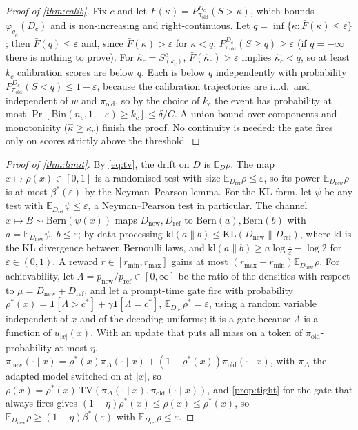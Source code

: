 \documentclass{article}
\theoremstyle{plain}
\theoremstyle{definition}
\theoremstyle{remark}
\newcommand{\E}{\mathbb{E}}
\newcommand{\TV}{\mathrm{TV}}
\newcommand{\KL}{\mathrm{KL}}
\newcommand{\kl}{\mathrm{kl}}
\newcommand{\Dref}{D_{\mathrm{ref}}}
\newcommand{\Dnew}{D_{\mathrm{new}}}
\newcommand{\pold}{\pi_{\mathrm{old}}}
\newcommand{\pnew}{\pi_{\mathrm{new}}}
\newcommand{\ind}{\mathbf{1}}
\begin{document}
\begin{proof}[Proof of \cref{thm:calib}]
Fix $c$ and let $\bar F(\kappa)=P^{D_c}_{\pold}(S>\kappa)$, which bounds $\varphi_{g_\kappa}(D_c)$ and is
non-increasing and right-continuous. Let
$q=\inf\{\kappa:\bar F(\kappa)\le\varepsilon\}$; then $\bar F(q)\le\varepsilon$ and, since $\bar F(\kappa)>\varepsilon$
for $\kappa<q$, $P^{D_c}_{\pold}(S\ge q)\ge\varepsilon$ (if $q=-\infty$ there is nothing to prove). For
$\hat\kappa_c=S^c_{(k_c)}$, $\bar F(\hat\kappa_c)>\varepsilon$ implies $\hat\kappa_c<q$, so at least $k_c$ calibration scores
are below $q$. Each is below $q$ independently with probability $P^{D_c}_{\pold}(S<q)\le1-\varepsilon$, because the
calibration trajectories are i.i.d.\ and independent of $w$ and $\pold$, so by the choice of $k_c$ the event has probability at
most $\Pr[\mathrm{Bin}(n_c,1-\varepsilon)\ge k_c]\le\delta/C$. A union bound over components and monotonicity
($\hat\kappa\ge\hat\kappa_c$) finish the proof. No continuity is needed: the gate fires only on scores strictly
above the threshold.
\end{proof}

\begin{proof}[Proof of \cref{thm:limit}]
By \cref{eq:tv}, the drift on $D$ is $\E_D\rho$. The map $x\mapsto\rho(x)\in[0,1]$ is a randomised test with size
$\E_{\Dref}\rho\le\varepsilon$, so its power $\E_{\Dnew}\rho$ is at most $\beta^\ast(\varepsilon)$ by the
Neyman--Pearson lemma. For the KL form, let $\psi$ be any test with $\E_{\Dref}\psi\le\varepsilon$, a Neyman--Pearson test in
particular. The channel $x\mapsto B\sim\mathrm{Bern}(\psi(x))$ maps $\Dnew,\Dref$ to $\mathrm{Bern}(a),\mathrm{Bern}(b)$
with $a=\E_{\Dnew}\psi$, $b\le\varepsilon$; by data processing $\kl(a\|b)\le\KL(\Dnew\|\Dref)$, where $\kl$ is the
KL divergence between Bernoulli laws, and $\kl(a\|b)\ge a\log\frac1\varepsilon-\log 2$ for $\varepsilon\in(0,1)$. A
reward $r\in[r_{\min},r_{\max}]$ gains at most $(r_{\max}-r_{\min})\E_{\Dnew}\rho$. For achievability, let
$\Lambda=p_{\mathrm{new}}/p_{\mathrm{ref}}\in[0,\infty]$ be the ratio of the densities with respect to
$\mu=\Dnew+\Dref$, and let a prompt-time gate fire with probability
$\rho^*(x)=\ind[\Lambda>c^\ast]+\gamma\ind[\Lambda=c^\ast]$, $\E_{\Dref}\rho^*=\varepsilon$, using a random variable
independent of $x$ and of the decoding uniforms; it is a gate because $\Lambda$ is a function of $u_{|x|}(x)$.
With an update that puts all mass on a token of $\pold$-probability at most $\eta$,
$\pnew(\cdot\mid x)=\rho^*(x)\pi_\Delta(\cdot\mid x)+(1-\rho^*(x))\pold(\cdot\mid x)$, with $\pi_\Delta$ the adapted
model switched on at $|x|$, so $\rho(x)=\rho^*(x)\,\TV(\pi_\Delta(\cdot\mid x),\pold(\cdot\mid x))$, and
\cref{prop:tight} for the gate that always fires gives $(1-\eta)\rho^*(x)\le\rho(x)\le\rho^*(x)$, so
$\E_{\Dnew}\rho\ge(1-\eta)\beta^\ast(\varepsilon)$ with $\E_{\Dref}\rho\le\varepsilon$.
\end{proof}
\end{document}
